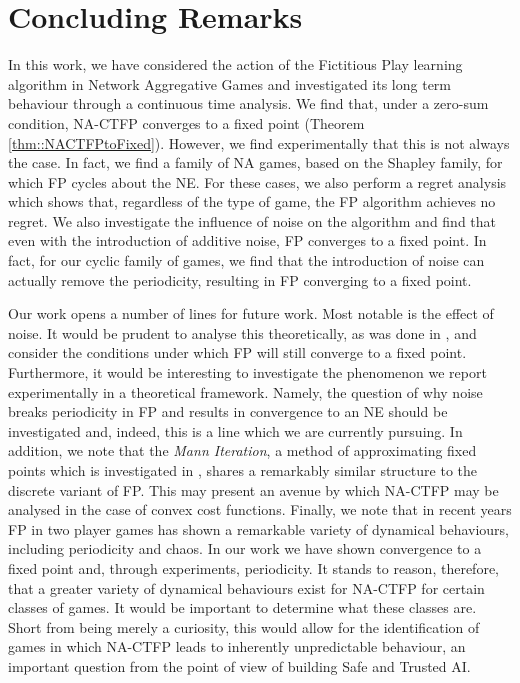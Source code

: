 \documentclass{article}
\theoremstyle{definition}
\begin{document}
\section{Concluding Remarks}
	In this work, we have considered the action of the Fictitious Play learning algorithm in Network Aggregative Games and investigated its long term behaviour through a continuous time analysis. We find that, under a zero-sum condition, NA-CTFP converges to a fixed point (Theorem \ref{thm::NACTFPtoFixed}). However, we find experimentally that this is not always the case. In fact, we find a family of NA games, based on the Shapley family, for which FP cycles about the NE. For these cases, we also perform a regret analysis which shows that, regardless of the type of game, the FP algorithm achieves no regret. 
%	
	We also investigate the influence of noise on the algorithm and find that even with the introduction of additive noise, FP converges to a fixed point. In fact, for our cyclic family of games, we find that the introduction of noise can actually remove the periodicity, resulting in FP converging to a fixed point.
	
	Our work opens a number of lines for future work. Most notable is the effect of noise. It would be prudent to analyse this theoretically, as was done in \cite{Perrin2020}, and consider the conditions under which FP will still converge to a fixed point. Furthermore, it would be interesting to investigate the phenomenon we report experimentally in a theoretical framework. Namely, the question of why noise breaks periodicity in FP and results in convergence to an NE should be investigated and, indeed, this is a line which we are currently pursuing.
%	
	In addition, we note that the \emph{Mann Iteration}, a method of approximating fixed points which is investigated in \cite{Parise2020}, shares a remarkably similar structure to the discrete variant of FP. This may present an avenue by which NA-CTFP may be analysed in the case of convex cost functions. 
%	
	Finally, we note that in recent years FP in two player games has shown a remarkable variety of dynamical behaviours, including periodicity and chaos. In our work we have shown convergence to a fixed point and, through experiments, periodicity. It stands to reason, therefore, that a greater variety of dynamical behaviours exist for NA-CTFP for certain classes of games. It would be important to determine what these classes are. Short from being merely a curiosity, this would allow for the identification of games in which NA-CTFP leads to inherently unpredictable behaviour, an important question from the point of view of building Safe and Trusted AI.
\end{document}
